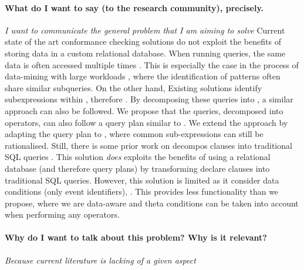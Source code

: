 \paragraph*{What do I want to say (to the research community), precisely.} \textit{I want to communicate the general problem that I am aiming to solve} 
Current state of the art conformance checking solutions do not exploit the benefits of storing data in a custom relational database. When running queries, the same data is often accessed multiple times \cite{BurattinMS16,bpm21}. This is especially the case in the process of data-mining with large workloads \cite{SchonigRCJM16}, where the identification of patterns often share similar subqueries. On the other hand, Existing solutions  \cite{BellatrecheKB21} identify  sub\add{-}expressions within , therefore  . By decomposing these queries into \LTLf, a similar approach can also be followed. We propose that the queries, decomposed into \LTLf operators, can also follow a query plan similar to \cite{BellatrecheKB21}. We extend the approach by adapting the query plan to , where common sub-expressions can still be rationalised. Still, there is some prior work on  decompos clauses into traditional SQL queries \cite{SchonigRCJM16}. This solution \emph{does} exploits the benefits of using a relational database (and therefore query plans) by transforming declare clauses into traditional SQL queries. However, this solution is limited as it  consider data conditions (only event identifiers), . This provides less functionality than we propose, where we are data-aware and theta conditions can be taken into account when performing any operators.

\paragraph*{Why do I want to talk about this problem? Why is it relevant?} \textit{Because current literature is lacking of a given aspect} 

